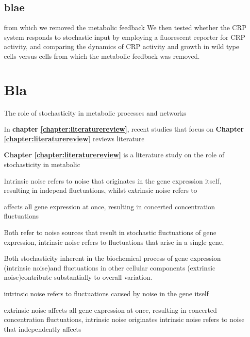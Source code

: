 

\section{blae}

from which we removed the metabolic feedback 
%
We then tested 
whether the CRP system responds to stochastic input by 
employing a fluorescent reporter for CRP activity, 
and comparing the dynamics of CRP activity and growth in 
wild type cells versus cells from which the metabolic feedback was removed.
%




\chapter*{Bla}


The role of stochasticity in metabolic processes and networks 

In \textbf{chapter \ref{chapter:literaturereview}}, recent studies that focus on 
\textbf{Chapter \ref{chapter:literaturereview}} reviews literature 




\textbf{Chapter \ref{chapter:literaturereview}} is a literature study on the role of stochasticity in metabolic 



Intrinsic noise refers to noise that originates in the gene expression itself, resulting in independ fluctuations,
whilst extrinsic noise refers to 

affects all gene expression at once, resulting in concerted concentration fluctuations

Both refer to noise sources that result in stochastic fluctuations of gene expression,
intrinsic noise refers to fluctuations that arise in a single gene,

Both stochasticity inherent in the
biochemical process of gene expression (intrinsic noise)and fluctuations in
other cellular components (extrinsic noise)contribute substantially to overall
variation.

intrinsic noise refers to fluctuations caused by noise in the gene itself

extrinsic noise affects all gene expression at once, resulting in concerted concentration fluctuations,
intrinsic noise originates 
intrinsic noise refers to noise that independently affects 

